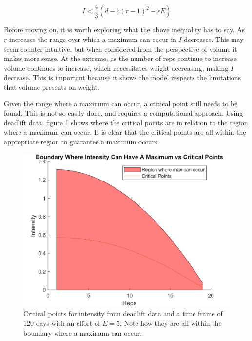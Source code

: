 \begin{equation*}
    I<\frac{4}{3}\left( d-c(r-1)^2-\epsilon E \right)
\end{equation*}

Before moving on, it is worth exploring what the above inequality has to say. As $r$ increases the range over which a maximum can occur in $I$ decreases. This may seem counter intuitive, but when considered from the perspective of volume it makes more sense. At the extreme, as the number of reps continue to increase volume continues to increase, which necessitates weight decreasing, making $I$ decrease. This is important because it shows the model respects the limitations that volume presents on weight.

Given the range where a maximum can occur, a critical point still needs to be found. This is not so easily done, and requires a computational approach. Using deadlift data, figure \ref{fig:DeadliftIntensityCriticalPoints} shows where the critical points are in relation to the region where a maximum can occur. It is clear that the critical points are all within the appropriate region to guarantee a maximum occurs.

\begin{figure}
    \centering
    \includegraphics[width=140mm]{DeadliftConstants/IntensityCriticalPoints.png}
    \caption{Critical points for intensity from deadlift data and a time frame of 120 days with an effort of $E=5$. Note how they are all within the boundary where a maximum can occur.}
    \label{fig:DeadliftIntensityCriticalPoints}
\end{figure}

